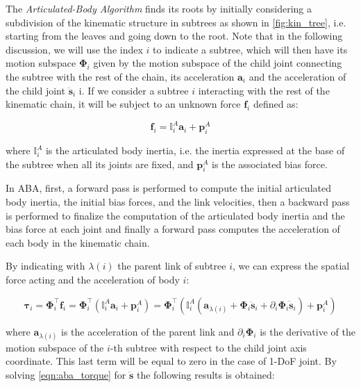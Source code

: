 The \textit{Articulated-Body Algorithm} \citep{featherstone_rigid_2008} finds its roots by initially considering a subdivision of the kinematic structure in subtrees as shown in \cref{fig:kin_tree}, i.e. starting from the leaves and going down to the root.
Note that in the following discussion, we will use the index $i$ to indicate a subtree, which will then have its motion subspace $\boldsymbol{\Phi}_i$ given by the motion subspace of the child joint connecting the subtree with the rest of the chain, its acceleration $\mathbf{a}_i$ and the acceleration of the child joint  $\ddot{\mathbf{s}} _i$ i.
If we consider a subtree $i$ interacting with the rest of the kinematic chain, it will be subject to an unknown force $\mathbf{f} _i$ defined as:

\begin{equation}
    \label{eqn:biasforce}
    \mathbf{f} _i = \mathbb{I} _i ^A \mathbf{a} _i + \mathbf{p} ^A _i
\end{equation}

where $\mathbb{I} _i ^A$ is the articulated body inertia, i.e. the inertia expressed at the base of the subtree when all its joints are fixed, and $\mathbf{p} ^A _i$ is the associated bias force.

In ABA, first, a forward pass is performed to compute the initial articulated body inertia, the initial bias forces, and the link velocities, then a backward pass is performed to finalize the computation of the articulated body inertia and the bias force at each joint and finally a forward pass computes the acceleration of each body in the kinematic chain.

By indicating with $\lambda(i)$ the parent link of subtree $i$, we can express the spatial force acting and the acceleration of body $i$:

\begin{equation}
    \label{eqn:aba_torque}
    \boldsymbol{\tau} _i = \boldsymbol{\Phi} ^\top _i \mathbf{f} _i = \boldsymbol{\Phi} ^\top _i (\mathbb{I} _i ^A \mathbf{a} _i + \mathbf{p} ^A _i) = \boldsymbol{\Phi} ^\top _i (\mathbb{I} _i ^A (\mathbf{a} _{\lambda(i)} + \boldsymbol{\Phi} _i \ddot{\mathbf{s}} _i + \partial_i \boldsymbol{\Phi} _i \dot{\mathbf{s}} _i)+ \mathbf{p} ^A _i)
\end{equation}

where $\mathbf{a} _{\lambda(i)}$ is the acceleration of the parent link and $\partial_i \boldsymbol{\Phi} _i$ is the derivative of the motion subspace of the $i$-th subtree with respect to the child joint axis coordinate. This last term will be equal to zero in the case of 1-\ac{DoF} joint.
By solving \cref{eqn:aba_torque} for $\ddot{\mathbf{s}}$ the following results is obtained:

